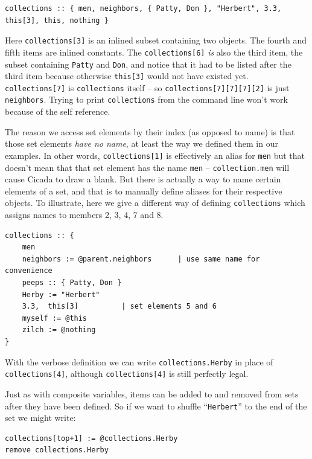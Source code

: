 \documentclass{article}
\newenvironment{code}{
       \begin{list}{}{
               \setlength{\leftmargin}{.4in}
               \setlength{\rightmargin}{0in}
               \setlength{\topsep}{.2in}
       }
       \small
       \item[] }
       { \end{list}   }
\begin{document}
\begin{code} \begin{verbatim}
collections :: { men, neighbors, { Patty, Don }, "Herbert", 3.3, this[3], this, nothing }
\end{verbatim} \end{code}

\noindent Here \verb#collections[3]# is an inlined subset containing two objects.  The fourth and fifth items are inlined constants.  The \verb#collections[6]# \emph{is} also the third item, the subset containing \verb#Patty# and \verb#Don#, and notice that it had to be listed after the third item because otherwise \texttt{this[3]} would not have existed yet.  \verb#collections[7]# is \verb#collections# itself -- so \verb#collections[7][7][7][2]# is just \verb#neighbors#.  Trying to print \verb#collections# from the command line won't work because of the self reference.

The reason we access set elements by their index (as opposed to name) is that those set elements \emph{have no name}, at least the way we defined them in our examples.  In other words, \verb#collections[1]# is effectively an alias for \verb#men# but that doesn't mean that that set element has the name \verb#men# -- \texttt{collection.men} will cause Cicada to draw a blank.  But there is actually a way to name certain elements of a set, and that is to manually define aliases for their respective objects.  To illustrate, here we give a different way of defining \texttt{collections} which assigns names to members 2, 3, 4, 7 and 8.

\begin{code} \begin{verbatim}
collections :: {
    men
    neighbors := @parent.neighbors      | use same name for convenience
    peeps :: { Patty, Don }
    Herby := "Herbert"
    3.3,  this[3]          | set elements 5 and 6
    myself := @this
    zilch := @nothing
}
\end{verbatim} \end{code}

\noindent With the verbose definition we can write \texttt{collections.Herby} in place of \texttt{collections[4]}, although \texttt{collections[4]} is still perfectly legal.

Just as with composite variables, items can be added to and removed from sets after they have been defined.  So if we want to shuffle ``\texttt{Herbert}'' to the end of the set we might write:

\begin{code} \begin{verbatim}
collections[top+1] := @collections.Herby
remove collections.Herby
\end{verbatim} \end{code}
\end{document}
